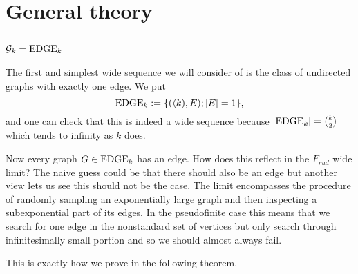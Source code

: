 \chapter{General theory}\label{chapgeneraltheory}
\section{\texorpdfstring{$\mathcal{G}_k=\text{EDGE}_k$}{Gk=EDGEk}}
The first and simplest wide sequence we will consider of is the class of undirected graphs with exactly one edge. We put
\[\text{EDGE}_k:=\{\text{$(\langle k),E); \left|{E}\right|=1$}\},\]
and one can check that this is indeed a wide sequence because $\left|{\text{EDGE}_k}\right|=\binom{k}{2}$ which tends to infinity as $k$ does.

Now every graph $G\in\text{EDGE}_k$ has an edge. How does this reflect in the $F_{rud}$ wide limit? The naive guess could be that there should also be an edge but another view lets us see this should not be the case. The limit encompasses the procedure of randomly sampling an exponentially large graph and then inspecting a subexponential part of its edges. In the pseudofinite case this means that we search for one edge in the nonstandard set of vertices but only search through infinitesimally small portion and so we should almost always fail.

This is exactly how we prove in the following theorem.

